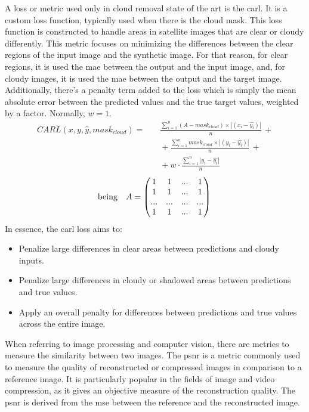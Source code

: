 A loss or metric used only in cloud removal state of the art is the \gls{carl}. It is a custom loss function, typically used when there is the cloud mask. This loss function is constructed to handle areas in satellite images that are clear or cloudy differently. This metric focuses on minimizing the differences between the clear regions of the input image and the synthetic image. For that reason, for clear regions, it is used the \gls{mae} between the output and the input image, and, for cloudy images, it is used the \gls{mae} between the output and the target image. Additionally, there's a penalty term added to the loss which is simply the mean absolute error between the predicted values and the true target values, weighted by a factor. Normally, $w = 1$.
\begin{align*}
CARL(x, y, \hat{y}, mask_{cloud}) =& \quad  \frac{\sum_{i=1}^{n} (A - mask_{cloud}) \times |(x_i - \hat{y_i})|}{n} \, + \\  & \quad + \frac{\sum_{i=1}^{n} mask_{cloud} \times |(y_i - \hat{y_i})|}{n} \, + \\ & \quad + w \cdot \frac{\sum_{i=1}^{n} |y_i - \hat{y_i}| }{n}
\end{align*}
\[\text{being} \quad A = 
\begin{pmatrix}
	1 & 1 & ... & 1 \\
	1 & 1 & ... & 1 \\
	... & ... & ... & ... \\
	1 & 1 & ... & 1
\end{pmatrix}\\
\quad\\\]
In essence, the \gls{carl} loss aims to:
\begin{itemize}
	\item Penalize large differences in clear areas between predictions and cloudy inputs.
	\item Penalize large differences in cloudy or shadowed areas between predictions and true values.
	\item Apply an overall penalty for differences between predictions and true values across the entire image.
\end{itemize}
When referring to image processing and computer vision, there are metrics to measure the similarity between two images. The \gls{psnr} is a metric commonly used to measure the quality of reconstructed or compressed images in comparison to a reference image. It is particularly popular in the fields of image and video compression, as it gives an objective measure of the reconstruction quality. The \gls{psnr} is derived from the \gls{mse} between the reference and the reconstructed image.
